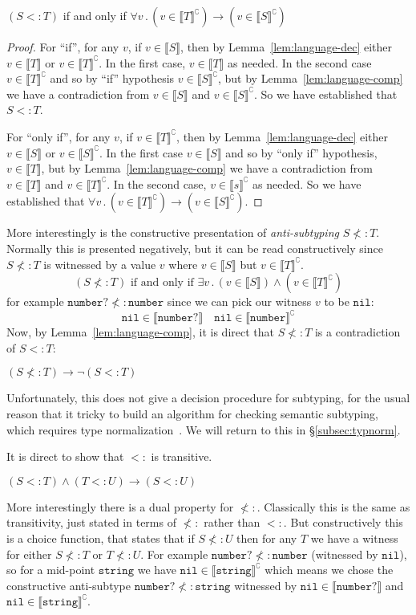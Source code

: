 \documentclass[acmsmall,review,screen]{acmart}
\newcommand{\NIL}{\mathtt{nil}}
\newcommand{\NUMBER}{\mathtt{number}}
\newcommand{\STRING}{\mathtt{string}}
\newcommand{\fun}{\mathbin{\rightarrow}}
\newcommand{\sem}[1]{\llbracket{#1}\rrbracket}
\newcommand{\nsem}[1]{\llbracket{#1}\rrbracket^\complement}
\newcommand{\st}{\mathbin.}
\begin{document}
\begin{lemma}
  \label{lem:nsubtyp}
  $(S <: T)$ if and only if $\forall v \st (v \in \nsem{T}) \fun (v \in \nsem{S})$
\end{lemma}
\begin{proof}
  For ``if'', for any $v$, if $v \in \sem{S}$, then by Lemma~\ref{lem:language-dec}
  either $v \in \sem{T}$ or $v \in \nsem{T}$. In the first case, $v \in \sem{T}$ as needed.
  In the second case $v \in \nsem{T}$ and so by ``if'' hypothesis $v \in \nsem{S}$,
  but by Lemma~\ref{lem:language-comp} we have a contradiction from $v \in \sem{S}$ and $v \in \nsem{S}$.
  So we have established that $S <: T$.

  For ``only if'', for any $v$, if $v \in \nsem{T}$, then by Lemma~\ref{lem:language-dec}
  either $v \in \sem{S}$ or $v \in \nsem{S}$. 
  In the first case $v \in \sem{S}$ and so by ``only if'' hypothesis, $v \in \sem{T}$,
  but by Lemma~\ref{lem:language-comp} we have a contradiction from $v \in \sem{T}$ and $v \in \nsem{T}$.
  In the second case, $v \in \nsem{s}$ as needed.
  So we have established that $\forall v \st (v \in \nsem{T}) \fun (v \in \nsem{S})$.
\end{proof}
  
More interestingly is the constructive presentation of \emph{anti-subtyping} $S \not<: T$. Normally this is
presented negatively, but it can be read constructively since $S \not<: T$ is witnessed by
a value $v$ where $v \in \sem{S}$ but $v \in \nsem{T}$.
\[
  (S \not<: T) \mbox{ if and only if } \exists v \st (v \in \sem{S}) \land (v \in \nsem{T})
\]
for example $\NUMBER? \not<: \NUMBER$ since we can pick our witness $v$ to be $\NIL$:
\[
  \NIL \in \sem{\NUMBER?}
  \quad
  \NIL \in \nsem{\NUMBER}
\]
Now, by Lemma~\ref{lem:language-comp}, it is direct that $S \not<: T$ is a contradiction of $S <: T$:

\begin{lemma}
  $(S \not<: T) \fun \neg(S <: T)$
\end{lemma}

Unfortunately, this does not give a decision procedure for
subtyping, for the usual reason that it tricky to build an algorithm for
checking semantic subtyping, which requires type normalization~\cite{???}.
We will return to this in \S\ref{subsec:typnorm}.

It is direct to show that $<:$ is transitive.

\begin{lemma}
  $(S <: T) \land (T <: U) \fun (S <: U)$
\end{lemma}
More interestingly there is a dual property for $\not<:$.
Classically this is the same as transitivity, just stated in terms of $\not<:$ 
rather than $<:$. But constructively this is a choice function, that states that if
$S \not<: U$ then for any $T$ we have a witness for either $S \not<: T$ or $T \not<: U$.
For example $\NUMBER? \not<: \NUMBER$ (witnessed by $\NIL$), so for a mid-point $\STRING$
we have $\NIL\in\nsem{\STRING}$ which means we chose the constructive anti-subtype
$\NUMBER? \not<: \STRING$ witnessed by $\NIL\in\sem{\NUMBER?}$ and $\NIL\in\nsem{\STRING}$.
\end{document}
